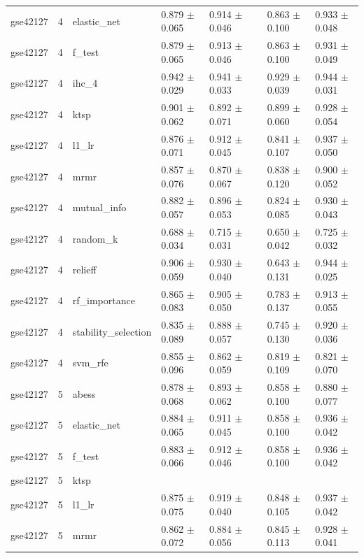 \begin{table}[t]
\begin{tabular}{llllllll}
    gse42127 & 4 & elastic\_net & 0.879 $\pm$ 0.065 & 0.914 $\pm$ 0.046 &  & 0.863 $\pm$ 0.100 & 0.933 $\pm$ 0.048 \\
    gse42127 & 4 & f\_test & 0.879 $\pm$ 0.065 & 0.913 $\pm$ 0.046 &  & 0.863 $\pm$ 0.100 & 0.931 $\pm$ 0.049 \\
    gse42127 & 4 & ihc\_4 & 0.942 $\pm$ 0.029 & 0.941 $\pm$ 0.033 &  & 0.929 $\pm$ 0.039 & 0.944 $\pm$ 0.031 \\
    gse42127 & 4 & ktsp & 0.901 $\pm$ 0.062 & 0.892 $\pm$ 0.071 &  & 0.899 $\pm$ 0.060 & 0.928 $\pm$ 0.054 \\
    gse42127 & 4 & l1\_lr & 0.876 $\pm$ 0.071 & 0.912 $\pm$ 0.045 &  & 0.841 $\pm$ 0.107 & 0.937 $\pm$ 0.050 \\
    gse42127 & 4 & mrmr & 0.857 $\pm$ 0.076 & 0.870 $\pm$ 0.067 &  & 0.838 $\pm$ 0.120 & 0.900 $\pm$ 0.052 \\
    gse42127 & 4 & mutual\_info & 0.882 $\pm$ 0.057 & 0.896 $\pm$ 0.053 &  & 0.824 $\pm$ 0.085 & 0.930 $\pm$ 0.043 \\
    gse42127 & 4 & random\_k & 0.688 $\pm$ 0.034 & 0.715 $\pm$ 0.031 &  & 0.650 $\pm$ 0.042 & 0.725 $\pm$ 0.032 \\
    gse42127 & 4 & relieff & 0.906 $\pm$ 0.059 & 0.930 $\pm$ 0.040 &  & 0.643 $\pm$ 0.131 & 0.944 $\pm$ 0.025 \\
    gse42127 & 4 & rf\_importance & 0.865 $\pm$ 0.083 & 0.905 $\pm$ 0.050 &  & 0.783 $\pm$ 0.137 & 0.913 $\pm$ 0.055 \\
    gse42127 & 4 & stability\_selection & 0.835 $\pm$ 0.089 & 0.888 $\pm$ 0.057 &  & 0.745 $\pm$ 0.130 & 0.920 $\pm$ 0.036 \\
    gse42127 & 4 & svm\_rfe & 0.855 $\pm$ 0.096 & 0.862 $\pm$ 0.059 &  & 0.819 $\pm$ 0.109 & 0.821 $\pm$ 0.070 \\
    gse42127 & 5 & abess & 0.878 $\pm$ 0.068 & 0.893 $\pm$ 0.062 &  & 0.858 $\pm$ 0.100 & 0.880 $\pm$ 0.077 \\
    gse42127 & 5 & elastic\_net & 0.884 $\pm$ 0.065 & 0.911 $\pm$ 0.045 &  & 0.858 $\pm$ 0.100 & 0.936 $\pm$ 0.042 \\
    gse42127 & 5 & f\_test & 0.883 $\pm$ 0.066 & 0.912 $\pm$ 0.046 &  & 0.858 $\pm$ 0.100 & 0.936 $\pm$ 0.042 \\
    gse42127 & 5 & ktsp &  &  &  &  &  \\
    gse42127 & 5 & l1\_lr & 0.875 $\pm$ 0.075 & 0.919 $\pm$ 0.040 &  & 0.848 $\pm$ 0.105 & 0.937 $\pm$ 0.042 \\
    gse42127 & 5 & mrmr & 0.862 $\pm$ 0.072 & 0.884 $\pm$ 0.056 &  & 0.845 $\pm$ 0.113 & 0.928 $\pm$ 0.041 \\

\end{tabular}
\end{table}
